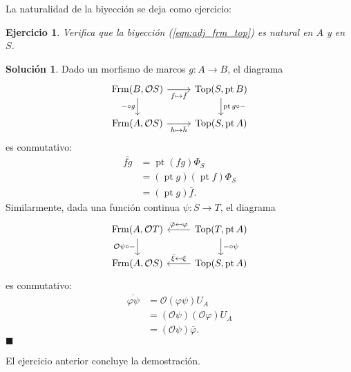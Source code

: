 \documentclass[12pt,letterpaper,titlepage]{article}
\newcommand{\xqed}[1]{%
  \leavevmode\unskip\penalty9999 \hbox{}\nobreak\hfill
  \quad\hbox{\ensuremath{#1}}}
\newtheorem{exe}{Ejercicio}
\theoremstyle{definition}
\newtheorem*{soltemp}{Solución}
\newenvironment{sol}[1]{%
    \begin{soltemp}#1}{%
    \xqed{\blacksquare}\end{soltemp}%
}
\newcommand\ol[1]{\overline{#1}}
\renewcommand\phi{\varphi}
\renewcommand\cal[1]{\mathcal{#1}}
\newcommand\<{\langle}
\renewcommand\>{\rangle}
\newcommand{\Frm}{\mathrm{Frm}}
\newcommand{\Top}{\mathrm{Top}}
\DeclareMathOperator{\pt}{pt}
\begin{document}
La naturalidad de la biyección se deja como ejercicio:
\begin{exe}%
    Verifica que la biyección (\ref{eqn:adj_frm_top})
    es natural en $A$ y en $S$.
\end{exe}
\begin{sol}
    Dado un morfismo de marcos $g:A\to B$, el diagrama
    \[
        \begin{tikzcd}
            \Frm(B,\cal OS) \ar[d,"{-}\circ g"'] \ar[r,"f\mapsto\bar f"']
            & \Top(S,\pt B)
            \ar[d,"\pt g\circ{-}"]
            \\
            \Frm(A,\cal OS) \ar[r,"h\mapsto\bar h"']
            & \Top(S,\pt A)
        \end{tikzcd}
    \]
    es conmutativo:
    \begin{align*}
        \ol{fg}
        &= \pt(fg)\Phi_S \\
        &= (\pt g)(\pt f)\Phi_S \\
        &= (\pt g)\bar f.
    \end{align*}
    Similarmente, dada una función continua $\psi:S\to T$,
    el diagrama
    \[
        \begin{tikzcd}
            \Frm(A,\cal OT)
            \ar[d,"\cal O\psi\circ{-}"']
            & \Top(T,\pt A) \ar[l,"\bar \phi\mapsfrom \phi"']
            \ar[d,"{-}\circ \psi"]
            \\
            \Frm(A,\cal OS)
            & \Top(S,\pt A) \ar[l,"\bar \xi\mapsfrom \xi"']
        \end{tikzcd}
    \]
    es conmutativo:
    \begin{align*}
        \ol{\phi\psi}
        &= \cal O(\phi\psi)U_A \\
        &= (\cal O\psi)(\cal O\phi)U_A \\
        &= (\cal O\psi)\bar\phi.
    \end{align*}
\end{sol}
El ejercicio anterior concluye la demostración.
\end{document}
